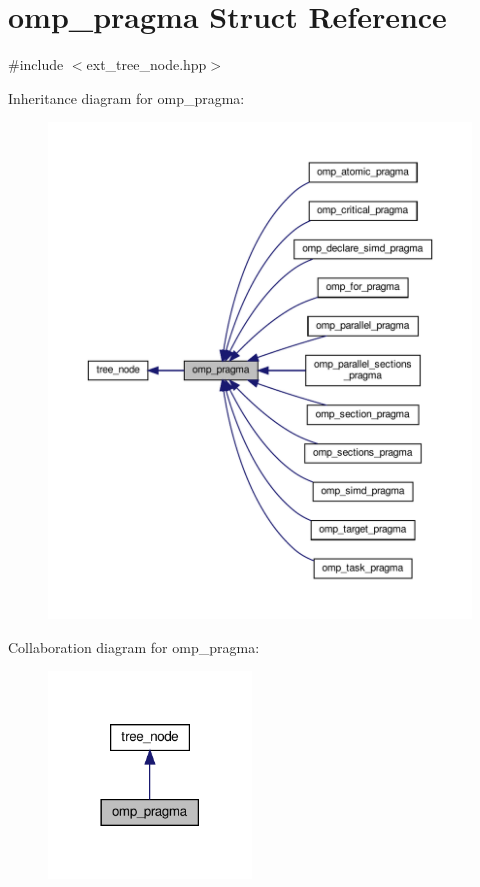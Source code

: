 \hypertarget{structomp__pragma}{}\section{omp\+\_\+pragma Struct Reference}
\label{structomp__pragma}


{\ttfamily \#include $<$ext\+\_\+tree\+\_\+node.\+hpp$>$}



Inheritance diagram for omp\+\_\+pragma\+:
\nopagebreak
\begin{figure}[H]
\begin{center}
\leavevmode
\includegraphics[width=350pt]{d0/d9e/structomp__pragma__inherit__graph}
\end{center}
\end{figure}


Collaboration diagram for omp\+\_\+pragma\+:
\nopagebreak
\begin{figure}[H]
\begin{center}
\leavevmode
\includegraphics[width=153pt]{d0/d60/structomp__pragma__coll__graph}
\end{center}
\end{figure}
